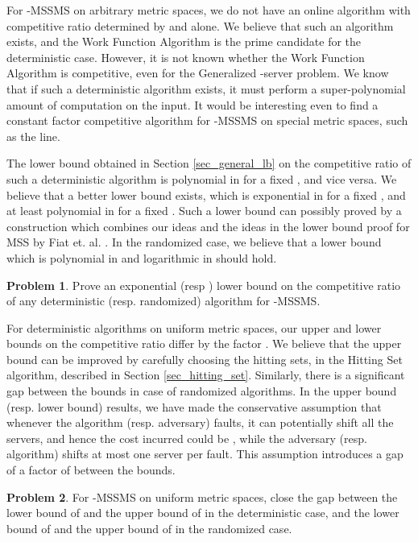 \documentclass[11pt]{article}
\theoremstyle{plain}\newtheorem{theorem}{Theorem}
\theoremstyle{definition}
\newtheorem{problem}{Problem}
\theoremstyle{remark}
\begin{document}
For -MSSMS on arbitrary metric spaces, we do not have an online algorithm with competitive ratio determined by  and  alone. We believe that such an algorithm exists, and the Work Function Algorithm is the prime candidate for the deterministic case. However, it is not known whether the Work Function Algorithm is competitive, even for the Generalized -server problem. We know that if such a deterministic algorithm exists, it must perform a super-polynomial amount of computation on the input. It would be interesting even to find a constant factor competitive algorithm for -MSSMS on special metric spaces, such as the line.

The lower bound obtained in Section \ref{sec_general_lb} on the competitive ratio of such a deterministic algorithm is polynomial in  for a fixed , and vice versa. We believe that a better lower bound exists, which is exponential in  for a fixed , and at least polynomial in  for a fixed . Such a lower bound can possibly proved by a construction which combines our ideas and the ideas in the  lower bound proof for MSS by Fiat et. al. \cite{FiatFKRRV98}. In the randomized case, we believe that a lower bound which is polynomial in  and logarithmic in  should hold.

\begin{problem}
Prove an exponential (resp ) lower bound on the competitive ratio of any deterministic (resp. randomized) algorithm for -MSSMS.
\end{problem}

For deterministic algorithms on uniform metric spaces, our upper and lower bounds on the competitive ratio differ by the factor . We believe that the upper bound can be improved by carefully choosing the hitting sets, in the Hitting Set algorithm, described in Section \ref{sec_hitting_set}. Similarly, there is a significant gap between the 
bounds in case of randomized algorithms. In the upper bound (resp. lower bound) results, we have made the conservative assumption that whenever the algorithm (resp. adversary) faults, it can potentially shift all the  servers, and hence the cost incurred could be , while the adversary (resp. algorithm) shifts at most one server per fault. This assumption introduces a gap of a factor of  between the bounds. 

\begin{problem}
For -MSSMS on uniform metric spaces, close the gap between the lower bound of  and the upper bound of  in the deterministic case, and the lower bound of  and the upper bound of  in the randomized case.
\end{problem}



\end{document}
